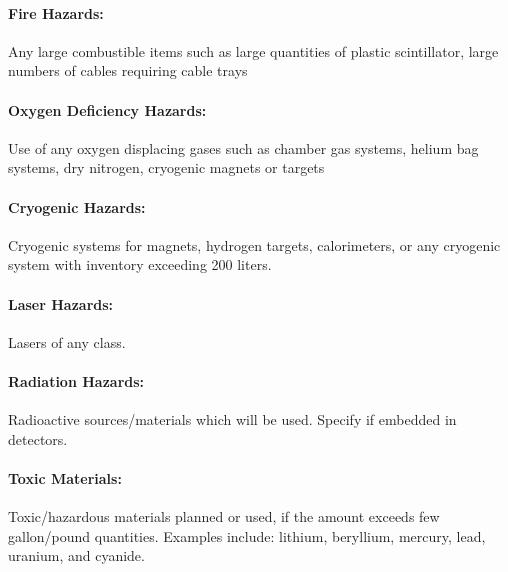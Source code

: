 \paragraph {Fire Hazards:}  Any large combustible items such as large quantities of 
plastic scintillator, large numbers of cables requiring cable trays

\paragraph {Oxygen Deficiency Hazards:} Use of any oxygen displacing gases such as 
chamber gas systems, helium bag systems, dry nitrogen, cryogenic magnets or targets

\paragraph {Cryogenic Hazards:} Cryogenic systems for magnets, hydrogen targets, 
calorimeters, or any cryogenic system with inventory exceeding 200 liters.

\paragraph {Laser Hazards:} Lasers of any class.

\paragraph {Radiation Hazards:} Radioactive sources/materials which will be used.
Specify if embedded in detectors.

\paragraph {Toxic Materials:}  Toxic/hazardous materials planned or used, if the
amount exceeds few gallon/pound quantities. Examples include: lithium, beryllium, 
mercury, lead, uranium, and cyanide.

